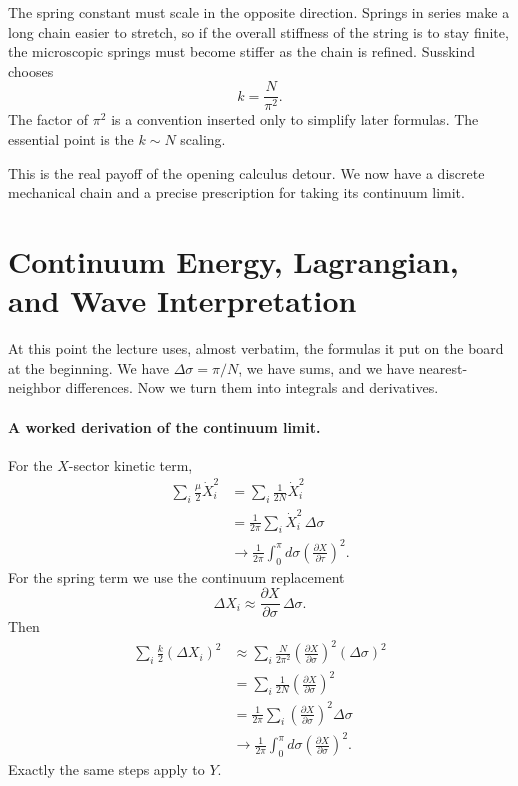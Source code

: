 The spring constant must scale in the opposite direction. Springs in series make a long chain easier to stretch, so if the overall stiffness of the string is to stay finite, the microscopic springs must become stiffer as the chain is refined. Susskind chooses
\begin{equation}
k=\frac{N}{\pi^2}.
\end{equation}
The factor of \(\pi^2\) is a convention inserted only to simplify later formulas. The essential point is the \(k\sim N\) scaling.

This is the real payoff of the opening calculus detour. We now have a discrete mechanical chain and a precise prescription for taking its continuum limit.

\section{Continuum Energy, Lagrangian, and Wave Interpretation}

At this point the lecture uses, almost verbatim, the formulas it put on the board at the beginning. We have \(\Delta \sigma=\pi/N\), we have sums, and we have nearest-neighbor differences. Now we turn them into integrals and derivatives.

\paragraph{A worked derivation of the continuum limit.}
For the \(X\)-sector kinetic term,
\begin{align}
\sum_i \frac{\mu}{2}\dot X_i^2
&=
\sum_i \frac{1}{2N}\dot X_i^2 \\
&=
\frac{1}{2\pi}\sum_i \dot X_i^2\,\Delta \sigma \\
&\longrightarrow
\frac{1}{2\pi}\int_0^\pi d\sigma
\left(\frac{\partial X}{\partial \tau}\right)^2.
\end{align}
For the spring term we use the continuum replacement
\begin{equation}
\Delta X_i \approx \frac{\partial X}{\partial \sigma}\,\Delta \sigma.
\end{equation}
Then
\begin{align}
\sum_i \frac{k}{2}(\Delta X_i)^2
&\approx
\sum_i \frac{N}{2\pi^2}
\left(\frac{\partial X}{\partial \sigma}\right)^2
(\Delta \sigma)^2 \\
&=
\sum_i \frac{1}{2N}
\left(\frac{\partial X}{\partial \sigma}\right)^2 \\
&=
\frac{1}{2\pi}\sum_i
\left(\frac{\partial X}{\partial \sigma}\right)^2
\Delta \sigma \\
&\longrightarrow
\frac{1}{2\pi}\int_0^\pi d\sigma
\left(\frac{\partial X}{\partial \sigma}\right)^2.
\end{align}
Exactly the same steps apply to \(Y\).

